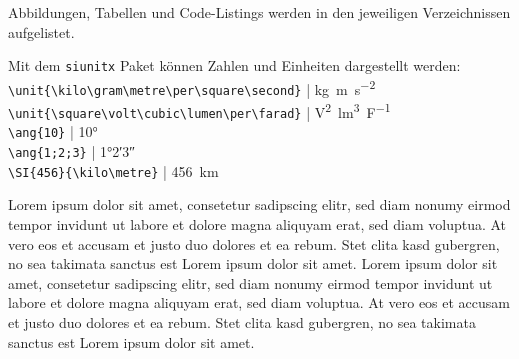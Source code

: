 Abbildungen, Tabellen und Code-Listings werden in den jeweiligen Verzeichnissen aufgelistet.

Mit dem \texttt{siunitx} Paket können Zahlen und Einheiten dargestellt werden: \\ 
\verb|\unit{\kilo\gram\metre\per\square\second}| | \unit{\kilo\gram\metre\per\square\second} \\
\verb|\unit{\square\volt\cubic\lumen\per\farad}| | \unit{\square\volt\cubic\lumen\per\farad} \\
\verb|\ang{10}| | \ang{10} \\
\verb|\ang{1;2;3}| | \ang{1;2;3} \\
\verb|\SI{456}{\kilo\metre}| | \SI{456}{\kilo\metre}


Lorem ipsum dolor sit amet, consetetur sadipscing elitr, sed diam nonumy eirmod tempor invidunt ut labore et dolore magna aliquyam erat, sed diam voluptua. At vero eos et accusam et justo duo dolores et ea rebum. Stet clita kasd gubergren, no sea takimata sanctus est Lorem ipsum dolor sit amet.  Lorem ipsum dolor sit amet, consetetur sadipscing elitr, sed diam nonumy eirmod tempor invidunt ut labore et dolore magna aliquyam erat, sed diam voluptua. At vero eos et accusam et justo duo dolores et ea rebum. Stet clita kasd gubergren, no sea takimata sanctus est Lorem ipsum dolor sit amet.

